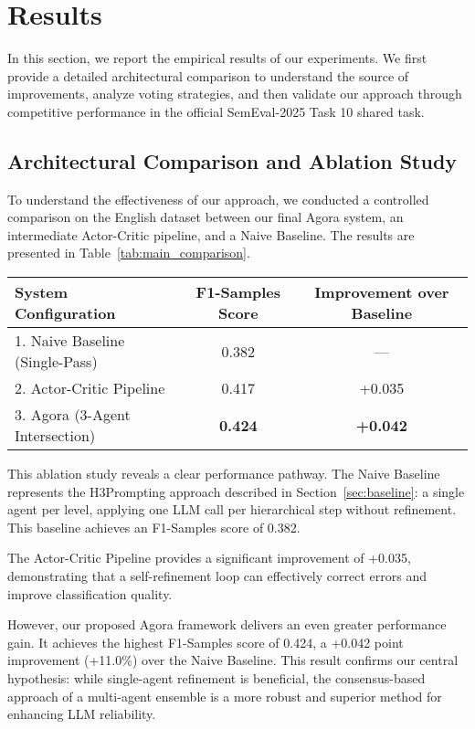 \section{Results}

In this section, we report the empirical results of our experiments. We first provide a detailed architectural comparison to understand the source of improvements, analyze voting strategies, and then validate our approach through competitive performance in the official SemEval-2025 Task 10 shared task.

\subsection{Architectural Comparison and Ablation Study}

To understand the effectiveness of our approach, we conducted a controlled comparison on the English dataset between our final Agora system, an intermediate Actor-Critic pipeline, and a Naive Baseline. The results are presented in Table~\ref{tab:main_comparison}.

\begin{table*}[ht]
\centering
\caption{Main Performance Comparison on the English Dataset (F1-Samples).}
\label{tab:main_comparison}
\begin{tabular}{lcc}
\hline
\textbf{System Configuration} & \textbf{F1-Samples Score} & \textbf{Improvement over Baseline} \\
\hline
1. Naive Baseline (Single-Pass) & 0.382 & --- \\
2. Actor-Critic Pipeline & 0.417 & +0.035 \\
3. Agora (3-Agent Intersection) & \textbf{0.424} & \textbf{+0.042} \\
\hline
\end{tabular}
\end{table*}

This ablation study reveals a clear performance pathway. The Naive Baseline represents the H3Prompting approach described in Section~\ref{sec:baseline}: a single agent per level, applying one LLM call per hierarchical step without refinement. This baseline achieves an F1-Samples score of 0.382.

The Actor-Critic Pipeline provides a significant improvement of +0.035, demonstrating that a self-refinement loop can effectively correct errors and improve classification quality.

However, our proposed Agora framework delivers an even greater performance gain. It achieves the highest F1-Samples score of 0.424, a +0.042 point improvement (+11.0\%) over the Naive Baseline. This result confirms our central hypothesis: while single-agent refinement is beneficial, the consensus-based approach of a multi-agent ensemble is a more robust and superior method for enhancing LLM reliability.

